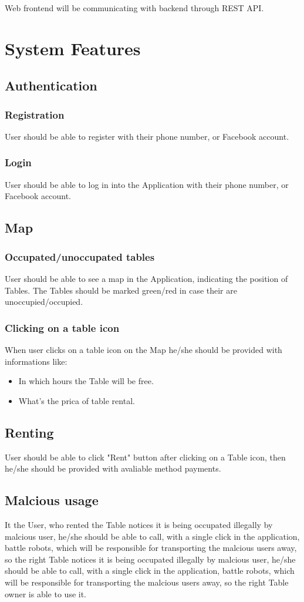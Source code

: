 \documentclass[14pt]{extarticle}
\begin{document}
Web frontend will be communicating with backend through REST API.
\section{System Features}
\subsection{Authentication}
\subsubsection{Registration}
User should be able to register with their phone number, or Facebook account.
\subsubsection{Login}
User should be able to log in into the Application with their phone number, or Facebook account.
\subsection{Map}
\subsubsection{Occupated/unoccupated tables}
User should be able to see a map in the Application, indicating the position of Tables. The Tables should be marked green/red in case their are unoccupied/occupied.
\subsubsection{Clicking on a table icon}
When user clicks on a table icon on the Map he/she should be provided with informations like:
\begin{itemize}
    \item In which hours the Table will be free.
    \item What's the prica of table rental.
\end{itemize}
\subsection{Renting}
User should be able to click "Rent" button after clicking on a Table icon, then he/she should be provided with avaliable method payments.
\subsection{Malcious usage}
It the User, who rented the Table notices it is being occupated illegally by malcious user, he/she should be able to call, with a single click in the application, battle robots, which will be responsible for transporting the malcious users away, so the right Table notices it is being occupated illegally by malcious user, he/she should be able to call, with a single click in the application, battle robots, which will be responsible for transporting the malcious users away, so the right Table owner is able to use it.
\end{document}
